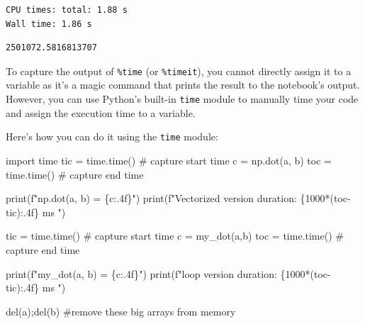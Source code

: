 \documentclass[
  letterpaper,
  DIV=11,
  numbers=noendperiod]{scrreprt}
\newenvironment{Shaded}{\begin{snugshade}}{\end{snugshade}}
\newcommand{\BuiltInTok}[1]{\textcolor[rgb]{0.00,0.23,0.31}{#1}}
\newcommand{\CommentTok}[1]{\textcolor[rgb]{0.37,0.37,0.37}{#1}}
\newcommand{\DecValTok}[1]{\textcolor[rgb]{0.68,0.00,0.00}{#1}}
\newcommand{\ImportTok}[1]{\textcolor[rgb]{0.00,0.46,0.62}{#1}}
\newcommand{\KeywordTok}[1]{\textcolor[rgb]{0.00,0.23,0.31}{#1}}
\newcommand{\NormalTok}[1]{\textcolor[rgb]{0.00,0.23,0.31}{#1}}
\newcommand{\OperatorTok}[1]{\textcolor[rgb]{0.37,0.37,0.37}{#1}}
\newcommand{\SpecialCharTok}[1]{\textcolor[rgb]{0.37,0.37,0.37}{#1}}
\newcommand{\SpecialStringTok}[1]{\textcolor[rgb]{0.13,0.47,0.30}{#1}}
\begin{document}
\begin{verbatim}
CPU times: total: 1.88 s
Wall time: 1.86 s
\end{verbatim}

\begin{verbatim}
2501072.5816813707
\end{verbatim}

To capture the output of \texttt{\%time} (or \texttt{\%timeit}), you
cannot directly assign it to a variable as it's a magic command that
prints the result to the notebook's output. However, you can use
Python's built-in \texttt{time} module to manually time your code and
assign the execution time to a variable.

Here's how you can do it using the \texttt{time} module:

\begin{Shaded}
\begin{Highlighting}[]
\ImportTok{import}\NormalTok{ time}
\NormalTok{tic }\OperatorTok{=}\NormalTok{ time.time()  }\CommentTok{\# capture start time}
\NormalTok{c }\OperatorTok{=}\NormalTok{ np.dot(a, b)}
\NormalTok{toc }\OperatorTok{=}\NormalTok{ time.time()  }\CommentTok{\# capture end time}

\BuiltInTok{print}\NormalTok{(}\SpecialStringTok{f"np.dot(a, b) =  }\SpecialCharTok{\{}\NormalTok{c}\SpecialCharTok{:.4f\}}\SpecialStringTok{"}\NormalTok{)}
\BuiltInTok{print}\NormalTok{(}\SpecialStringTok{f"Vectorized version duration: }\SpecialCharTok{\{}\DecValTok{1000}\OperatorTok{*}\NormalTok{(toc}\OperatorTok{{-}}\NormalTok{tic)}\SpecialCharTok{:.4f\}}\SpecialStringTok{ ms "}\NormalTok{)}

\NormalTok{tic }\OperatorTok{=}\NormalTok{ time.time()  }\CommentTok{\# capture start time}
\NormalTok{c }\OperatorTok{=}\NormalTok{ my\_dot(a,b)}
\NormalTok{toc }\OperatorTok{=}\NormalTok{ time.time()  }\CommentTok{\# capture end time}

\BuiltInTok{print}\NormalTok{(}\SpecialStringTok{f"my\_dot(a, b) =  }\SpecialCharTok{\{}\NormalTok{c}\SpecialCharTok{:.4f\}}\SpecialStringTok{"}\NormalTok{)}
\BuiltInTok{print}\NormalTok{(}\SpecialStringTok{f"loop version duration: }\SpecialCharTok{\{}\DecValTok{1000}\OperatorTok{*}\NormalTok{(toc}\OperatorTok{{-}}\NormalTok{tic)}\SpecialCharTok{:.4f\}}\SpecialStringTok{ ms "}\NormalTok{)}

\KeywordTok{del}\NormalTok{(a)}\OperatorTok{;}\KeywordTok{del}\NormalTok{(b)  }\CommentTok{\#remove these big arrays from memory}
\end{Highlighting}
\end{Shaded}
\end{document}
